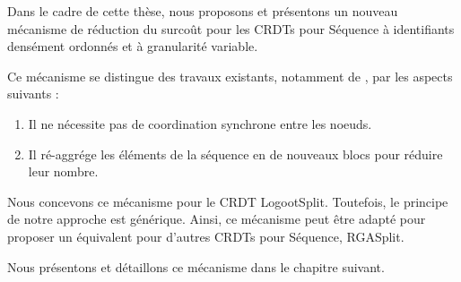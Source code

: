 \label{sec:etat-art-proposition}

Dans le cadre de cette thèse, nous proposons et présentons un nouveau mécanisme de réduction du surcoût pour les \acp{CRDT} pour Séquence à identifiants densément ordonnés et à granularité variable.

Ce mécanisme se distingue des travaux existants, notamment de \cite{letia:hal-01248270,zawirski:hal-01248197}, par les aspects suivants :
\begin{enumerate}
    \item Il ne nécessite pas de coordination synchrone entre les noeuds.
    \item Il ré-aggrége les éléments de la séquence en de nouveaux blocs pour réduire leur nombre.
\end{enumerate}

Nous concevons ce mécanisme pour le \ac{CRDT} LogootSplit.
Toutefois, le principe de notre approche est générique.
Ainsi, ce mécanisme peut être adapté pour proposer un équivalent pour d'autres \acp{CRDT} pour Séquence, \eg RGASplit.

Nous présentons et détaillons ce mécanisme dans le chapitre suivant.
